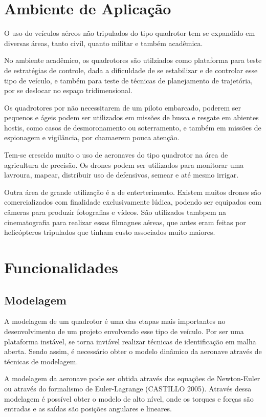 \section{Ambiente de Aplicação}
O uso do veículos aéreos não tripulados do tipo quadrotor tem se expandido em diversas áreas, tanto civíl, quanto militar e também acadêmica.

No ambiente acadêmico, os quadrotores são utilziados como plataforma para teste de estratégias de controle, dada a dificuldade de se estabilizar e de controlar esse tipo de veículo, e também para teste de técnicas de planejamento de trajetória, por se deslocar no espaço tridimensional.

Os quadrotores por não necessitarem de um piloto embarcado, poderem ser pequenos e ágeis podem ser utilizados em missões de busca e resgate em abientes hostis, como casos de desmoronamento ou soterramento, e também em missões de espionagem e vigilância, por chamaerem pouca atenção.

Tem-se crescido muito o uso de aeronaves do tipo quadrotor na área de agricultura de precisão. Os drones podem ser utilizados para monitorar uma lavroura, mapear, distribuir uso de defensivos, semear e até mesmo irrigar.

Outra área de grande utilização é a de enterterimento. Existem muitos drones são comercializados com finalidade exclusivamente lúdica, podendo ser equipados com câmeras para produzir fotografias e vídeos. São utilizados tambpem na cinematografia para realizar essas filmagnes aéreas, que antes eram feitas por helicópteros tripulados que tinham custo associados muito maiores.


\section{Funcionalidades}

\subsection{Modelagem}
A modelagem de um quadrotor é uma das etapas mais importantes no desenvolvimento de um projeto envolvendo esse tipo de veículo. Por ser uma plataforma instável, se torna inviável realizar técnicas de identificação em malha aberta. Sendo assim, é necessário obter o modelo dinâmico da aeronave através de técnicas de modelagem.

A modelagem da aeronave pode ser obtida através das equações de Newton-Euler ou através do formalismo de Euler-Lagrange (CASTILLO 2005). Através dessa modelagem é possível obter o modelo de alto nível, onde os torques e forças são entradas e as saídas são posições angulares e lineares. 

